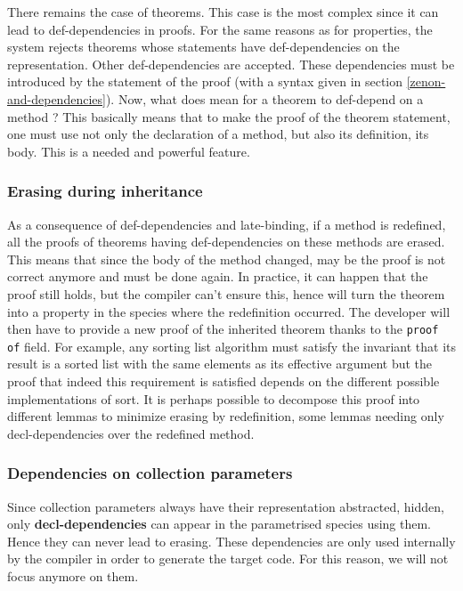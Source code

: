 \smallskip There remains the case of theorems. This case is the most
complex since it can lead to def-dependencies in proofs. For the same
reasons as for properties, the {\focal} system rejects theorems
whose statements have def-dependencies on the representation. Other
def-dependencies are accepted.  These dependencies must be introduced
by the statement of the proof (with a syntax given in section
\ref{zenon-and-dependencies}).  Now, what does mean for a theorem to
def-depend on a method ? This basically means that to make the proof
of the theorem statement, one must use not only the declaration of a
method, but also its definition, its body. This is a needed and powerful
feature.



\subsubsection{Erasing during inheritance}
\label{erasing}
As a consequence of def-dependencies and late-binding, if a method is
redefined, all the proofs of theorems having def-dependencies on these
methods are erased. This means that since the body of the method
changed, may be the proof is not correct anymore and must be done
again. In practice, it can happen that the proof still holds, but the
compiler can't ensure this, hence will turn the theorem into a
property in the species where the redefinition occurred. The developer
will then have to provide a new proof of the inherited theorem thanks
to the {\tt proof of} field. For example, any sorting list algorithm
must satisfy the invariant that its result is a sorted list with the
same elements as its effective argument  but the
proof that indeed this requirement is satisfied depends on the
different possible implementations of sort. It is perhaps possible to
decompose this proof into different lemmas to minimize erasing by
redefinition, some lemmas needing only decl-dependencies over the
redefined method.



\subsubsection{Dependencies on collection parameters}
Since collection parameters always have their representation abstracted,
hidden, only {\bf decl-dependencies} can appear in the parametrised
species using them. Hence they can never lead to erasing. These
dependencies are only used internally by the {\focal} compiler in order
to generate the target code. For this reason, we will not focus anymore
on them.
